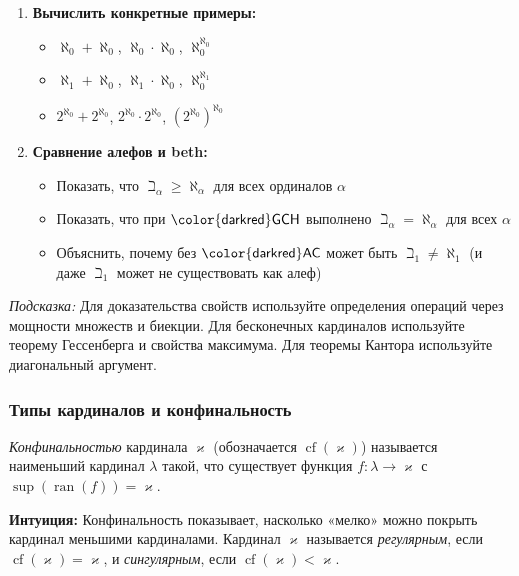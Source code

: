 \documentclass[11pt, a4paper]{extarticle}
\newcommand{\al}{\alpha}
\newcommand{\la}{\lambda}
\newcommand{\ka}{\varkappa}
\renewcommand{\ge}{\geqslant}
\newcommand{\AC}{\ifmmode \mathsf{\color{darkred}AC}\else ${\mathsf{\color{darkred}AC}}$\fi\xspace}
\newcommand{\GCH}{\ifmmode \mathsf{GCH}\else ${\mathsf{\color{darkred}GCH}}$\fi\xspace}
\newcommand{\cf}{\mathop{\mathrm{cf}}}
\newcommand{\ran}{\mathop{\mathrm{ran}}}
\begin{document}
\begin{exercise}
\begin{enumerate}
    \item \textbf{Вычислить конкретные примеры:}
    \begin{itemize}
        \item $\aleph_0 + \aleph_0$, $\aleph_0 \cdot \aleph_0$, $\aleph_0^{\aleph_0}$
        \item $\aleph_1 + \aleph_0$, $\aleph_1 \cdot \aleph_0$, $\aleph_0^{\aleph_1}$
        \item $2^{\aleph_0} + 2^{\aleph_0}$, $2^{\aleph_0} \cdot 2^{\aleph_0}$, $(2^{\aleph_0})^{\aleph_0}$
    \end{itemize}
    
    \item \textbf{Сравнение алефов и beth:}
    \begin{itemize}
        \item Показать, что $\beth_\al \ge \aleph_\al$ для всех ординалов $\al$
        \item Показать, что при \GCH выполнено $\beth_\al = \aleph_\al$ для всех $\al$
        \item Объяснить, почему без \AC может быть $\beth_1 \neq \aleph_1$ (и даже $\beth_1$ может не существовать как алеф)
    \end{itemize}
\end{enumerate}

\textit{Подсказка:} Для доказательства свойств используйте определения операций через мощности множеств и биекции. Для бесконечных кардиналов используйте теорему Гессенберга и свойства максимума. Для теоремы Кантора используйте диагональный аргумент.
\end{exercise}

\subsubsection{Типы кардиналов и конфинальность}

\begin{definition}
\textit{Конфинальностью} кардинала $\ka$ (обозначается $\cf(\ka)$) называется наименьший кардинал $\la$ такой, что существует функция $f: \la \to \ka$ с $\sup(\ran(f)) = \ka$.

\textbf{Интуиция:} Конфинальность показывает, насколько «мелко» можно покрыть кардинал меньшими кардиналами. Кардинал $\ka$ называется \textit{регулярным}, если $\cf(\ka) = \ka$, и \textit{сингулярным}, если $\cf(\ka) < \ka$.
\end{definition}
\end{document}

